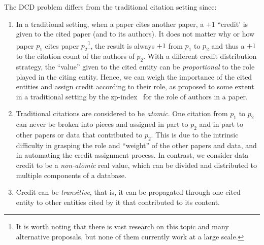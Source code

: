 The DCD problem differs from the traditional citation setting since:
\begin{enumerate}
    \item In a traditional setting, when a paper cites another paper, a $+1$ ``credit' is given to the cited paper (and to its authors). It does not matter why or how paper $p_1$ cites paper $p_2$\footnote{It is worth noting that there is vast research on this topic and many alternative proposals, but none of them currently work at a large scale.}, the result is always $+1$ from $p_1$ to $p_2$ and thus a $+1$ to the citation count of the authors of $p_2$. With a different credit distribution strategy, the ``value'' given to the cited entity can be \emph{proportional} to the role played in the citing entity. Hence, we can weigh the importance of the cited entities and assign credit according to their role, as proposed to some extent in a traditional setting by the zp-index~\citep{ZouP16} for the role of authors in a paper.
    \item Traditional citations are considered to be  \emph{atomic}. One citation from $p_1$ to $p_2$ can never be broken into pieces and assigned in part to $p_2$ and in part to other papers or data that contributed to $p_2$. This is due to the intrinsic difficulty in grasping the role and ``weight'' of the other papers and data, and in automating the credit assignment process.
	In contrast, we consider data credit to be a \emph{non-atomic} real value, which can be divided and distributed to multiple components of a database. 
	\item Credit can be \emph{transitive}, that is, it can be propagated through one cited entity to other entities cited by it that contributed to its content.
\end{enumerate}

